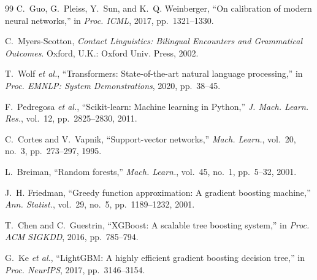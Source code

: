 \documentclass[10pt,conference]{IEEEtran}
\begin{document}
\begin{thebibliography}{99}
C.~Guo, G.~Pleiss, Y.~Sun, and K.~Q. Weinberger, ``On calibration of modern neural networks,'' in \emph{Proc. ICML}, 2017, pp.~1321--1330.

C.~Myers-Scotton, \emph{Contact Linguistics: Bilingual Encounters and Grammatical Outcomes}. Oxford, U.K.: Oxford Univ. Press, 2002.

T.~Wolf \emph{et al.}, ``Transformers: State-of-the-art natural language processing,'' in \emph{Proc. EMNLP: System Demonstrations}, 2020, pp.~38--45.

F.~Pedregosa \emph{et al.}, ``Scikit-learn: Machine learning in Python,'' \emph{J. Mach. Learn. Res.}, vol.~12, pp.~2825--2830, 2011.

C.~Cortes and V.~Vapnik, ``Support-vector networks,'' \emph{Mach. Learn.}, vol.~20, no.~3, pp.~273--297, 1995.

L.~Breiman, ``Random forests,'' \emph{Mach. Learn.}, vol.~45, no.~1, pp.~5--32, 2001.

J.~H. Friedman, ``Greedy function approximation: A gradient boosting machine,'' \emph{Ann. Statist.}, vol.~29, no.~5, pp.~1189--1232, 2001.

T.~Chen and C.~Guestrin, ``XGBoost: A scalable tree boosting system,'' in \emph{Proc. ACM SIGKDD}, 2016, pp.~785--794.

G.~Ke \emph{et al.}, ``LightGBM: A highly efficient gradient boosting decision tree,'' in \emph{Proc. NeurIPS}, 2017, pp.~3146--3154.

\end{thebibliography}
\end{document}

